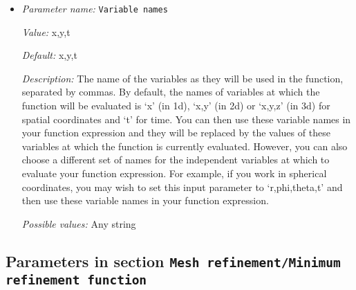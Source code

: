 \begin{itemize}
{\it Value:} 0


{\it Default:} 0


{\it Description:} The formula that denotes the function you want to evaluate for particular values of the independent variables. This expression may contain any of the usual operations such as addition or multiplication, as well as all of the common functions such as `sin' or `cos'. In addition, it may contain expressions like `if(x>0, 1, -1)' where the expression evaluates to the second argument if the first argument is true, and to the third argument otherwise. For a full overview of possible expressions accepted see the documentation of the muparser library at http://muparser.beltoforion.de/.

If the function you are describing represents a vector-valued function with multiple components, then separate the expressions for individual components by a semicolon.


{\it Possible values:} Any string
\item {\it Parameter name:} {\tt Variable names}
\label{parameters:Mesh refinement/Maximum refinement function/Variable names}


{\it Value:} x,y,t


{\it Default:} x,y,t


{\it Description:} The name of the variables as they will be used in the function, separated by commas. By default, the names of variables at which the function will be evaluated is `x' (in 1d), `x,y' (in 2d) or `x,y,z' (in 3d) for spatial coordinates and `t' for time. You can then use these variable names in your function expression and they will be replaced by the values of these variables at which the function is currently evaluated. However, you can also choose a different set of names for the independent variables at which to evaluate your function expression. For example, if you work in spherical coordinates, you may wish to set this input parameter to `r,phi,theta,t' and then use these variable names in your function expression.


{\it Possible values:} Any string
\end{itemize}

\subsection{Parameters in section \tt Mesh refinement/Minimum refinement function}
\label{parameters:Mesh_20refinement/Minimum_20refinement_20function}

